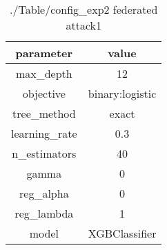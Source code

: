 \begin{table}[h]
\centering
\begin{tabular}{|c|c|}
\hline
parameter & value\\
\hline
max_depth & 12 \\\hline
objective & binary:logistic \\\hline
tree_method & exact \\\hline
learning_rate & 0.3 \\\hline
n_estimators & 40 \\\hline
gamma & 0 \\\hline
reg_alpha & 0 \\\hline
reg_lambda & 1 \\\hline
model & XGBClassifier \\\hline

\end{tabular}\caption{./Table/config_exp2 federated attack1}
\label{tab:./Table/config_exp2 federated attack1}
\end{table}
